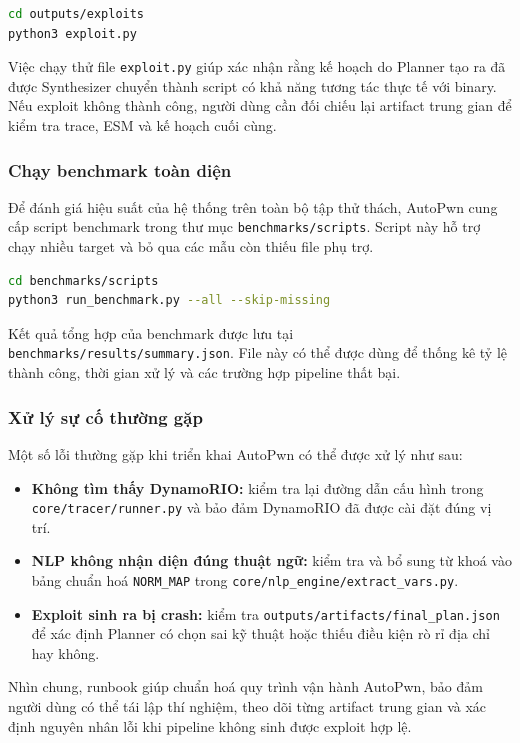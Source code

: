 \documentclass[final]{hcmuitthesis}
\begin{document}
\begin{lstlisting}[language=bash]
cd outputs/exploits
python3 exploit.py
\end{lstlisting}

Việc chạy thử file \texttt{exploit.py} giúp xác nhận rằng kế hoạch do Planner tạo ra đã được Synthesizer chuyển thành script có khả năng tương tác thực tế với binary. Nếu exploit không thành công, người dùng cần đối chiếu lại artifact trung gian để kiểm tra trace, ESM và kế hoạch cuối cùng.

\subsubsection{Chạy benchmark toàn diện}
Để đánh giá hiệu suất của hệ thống trên toàn bộ tập thử thách, AutoPwn cung cấp script benchmark trong thư mục \texttt{benchmarks/scripts}. Script này hỗ trợ chạy nhiều target và bỏ qua các mẫu còn thiếu file phụ trợ.

\begin{lstlisting}[language=bash]
cd benchmarks/scripts
python3 run_benchmark.py --all --skip-missing
\end{lstlisting}

Kết quả tổng hợp của benchmark được lưu tại \texttt{benchmarks/results/summary.json}. File này có thể được dùng để thống kê tỷ lệ thành công, thời gian xử lý và các trường hợp pipeline thất bại.

\subsubsection{Xử lý sự cố thường gặp}
Một số lỗi thường gặp khi triển khai AutoPwn có thể được xử lý như sau:
\begin{itemize}
    \item \textbf{Không tìm thấy DynamoRIO:} kiểm tra lại đường dẫn cấu hình trong \texttt{core/tracer/runner.py} và bảo đảm DynamoRIO đã được cài đặt đúng vị trí.
    \item \textbf{NLP không nhận diện đúng thuật ngữ:} kiểm tra và bổ sung từ khoá vào bảng chuẩn hoá \texttt{NORM\_MAP} trong \texttt{core/nlp\_engine/extract\_vars.py}.
    \item \textbf{Exploit sinh ra bị crash:} kiểm tra \texttt{outputs/artifacts/final\_plan.json} để xác định Planner có chọn sai kỹ thuật hoặc thiếu điều kiện rò rỉ địa chỉ hay không.
\end{itemize}

Nhìn chung, runbook giúp chuẩn hoá quy trình vận hành AutoPwn, bảo đảm người dùng có thể tái lập thí nghiệm, theo dõi từng artifact trung gian và xác định nguyên nhân lỗi khi pipeline không sinh được exploit hợp lệ.
\end{document}
